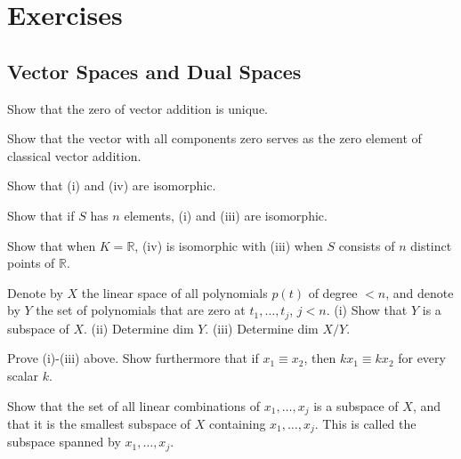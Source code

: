 \section{Exercises} 

\subsection{Vector Spaces and Dual Spaces} 

  \begin{exercise}[Lax 1.1] 
    Show that the zero of vector addition is unique.
  \end{exercise}

  \begin{exercise}[Lax 1.2] 
    Show that the vector with all components zero serves as the zero element of classical vector addition.
  \end{exercise}

  \begin{exercise}[Lax 1.3] 
    Show that (i) and (iv) are isomorphic.
  \end{exercise}

  \begin{exercise}[Lax 1.4] 
    Show that if $S$ has $n$ elements, (i) and (iii) are isomorphic.
  \end{exercise}

  \begin{exercise}[Lax 1.5] 
    Show that when $K = \mathbb{R}$, (iv) is isomorphic with (iii) when $S$ consists of $n$ distinct points of $\mathbb{R}$.
  \end{exercise}

  \begin{exercise}[Lax 1.6] 
    Denote by $X$ the linear space of all polynomials $p(t)$ of degree $< n$, and denote by $Y$ the set of polynomials that are zero at $t_1,\ldots,t_j$, $j < n$.
    (i) Show that $Y$ is a subspace of $X$.
    (ii) Determine dim $Y$.
    (iii) Determine dim $X/Y$.
  \end{exercise}

  \begin{exercise}[Lax 1.7] 
    Prove (i)-(iii) above. Show furthermore that if $x_1 \equiv x_2$, then $kx_1 \equiv kx_2$ for every scalar $k$.
  \end{exercise}

  \begin{exercise}[Lax 1.9] 
    Show that the set of all linear combinations of $x_1,\ldots,x_j$ is a subspace of $X$, and that it is the smallest subspace of $X$ containing $x_1,\ldots,x_j$. This is called the subspace spanned by $x_1,\ldots,x_j$.
  \end{exercise}

